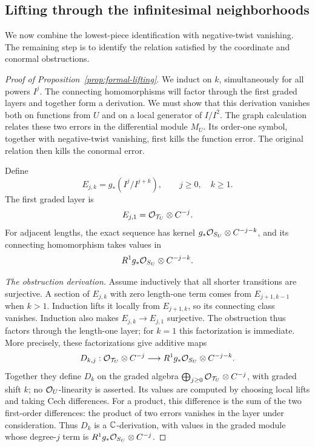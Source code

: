 \subsection{Lifting through the infinitesimal neighborhoods}

We now combine the lowest-piece identification with negative-twist
vanishing. The remaining step is to identify the relation satisfied
by the coordinate and conormal obstructions.

\begin{proof}[Proof of Proposition~\ref{prop:formal-lifting}]
We induct on \(k\), simultaneously for all powers \(I^j\).
The connecting homomorphisms will factor through the first
graded layers and together form a derivation.  We must show
that this derivation vanishes both on functions from \(U\)
and on a local generator of \(I/I^2\).  The graph calculation
relates these two errors in the differential module \(M_U\).
Its order-one symbol, together with negative-twist vanishing,
first kills the function error.  The original relation then
kills the conormal error.

Define
\[
 E_{j,k}=g_*(I^j/I^{j+k}),\qquad j\geq0,\quad k\geq1.
\]
The first graded layer is
\[
 E_{j,1}=\mathcal{O}_{\mathcal T_U}\otimes C^{-j}.
\]
For adjacent lengths, the exact sequence has kernel
\(g_*\mathcal{O}_{S_U}\otimes C^{-j-k}\), and its connecting homomorphism
takes values in
\[
 R^1g_*\mathcal{O}_{S_U}\otimes C^{-j-k}.
\]

\smallskip\noindent\emph{The obstruction derivation.}
Assume inductively that all shorter transitions are surjective.
A section of
\(E_{j,k}\) with zero length-one term comes from \(E_{j+1,k-1}\)
when \(k>1\).  Induction lifts it locally from \(E_{j+1,k}\),
so its connecting class vanishes.  Induction also makes
\(E_{j,k}\to E_{j,1}\) surjective.  The obstruction thus
factors through the length-one layer; for \(k=1\) this
factorization is immediate.  More precisely, these factorizations
give additive maps
\[
 D_{k,j}:\mathcal{O}_{\mathcal T_U}\otimes C^{-j}
       \longrightarrow R^1g_*\mathcal{O}_{S_U}\otimes C^{-j-k}.
\]
Together they define \(D_k\) on the graded algebra
\(\bigoplus_{j\geq0}\mathcal{O}_{\mathcal T_U}\otimes C^{-j}\), with
graded shift \(k\); no \(\mathcal{O}_U\)-linearity is asserted.
Its values are computed by choosing local
lifts and taking Cech differences.  For a product, this
difference is the sum of the two first-order differences:
the product of two errors vanishes in the layer under
consideration.  Thus \(D_k\) is a \(\mathbb{C}\)-derivation, with
values in the graded module whose degree-\(j\) term is
\(R^1g_*\mathcal{O}_{S_U}\otimes C^{-j}\).


\end{proof}
